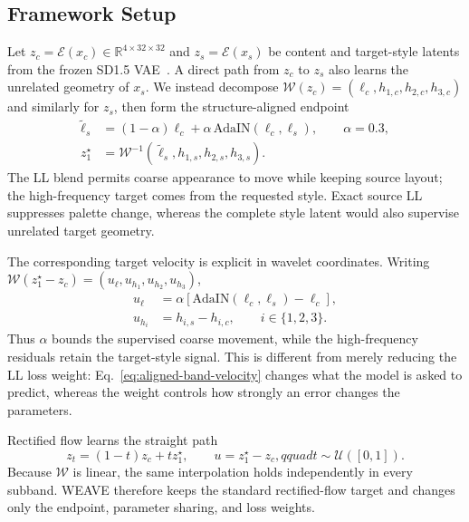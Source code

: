 \documentclass[letterpaper]{article}
\begin{document}
\subsection{Framework Setup}
\label{sec:framework}

Let $z_c=\mathcal E(x_c)\in\mathbb R^{4\times32\times32}$ and
$z_s=\mathcal E(x_s)$ be content and target-style latents from the frozen SD1.5
VAE~\cite{rombach2022high}. A direct path from $z_c$ to $z_s$ also learns the unrelated
geometry of $x_s$. We instead decompose
$\mathcal W(z_c)=(\ell_c,h_{1,c},h_{2,c},h_{3,c})$ and similarly for $z_s$, then form
the structure-aligned endpoint
\begin{equation}
\begin{aligned}
\tilde\ell_s &=(1-\alpha)\ell_c+
\alpha\,\mathrm{AdaIN}(\ell_c,\ell_s),\qquad \alpha=0.3,\\
z_1^\star&=\mathcal W^{-1}(\tilde\ell_s,h_{1,s},h_{2,s},h_{3,s}).
\end{aligned}
\label{eq:aligned-target}
\end{equation}
The LL blend permits coarse appearance to move while keeping source layout; the
high-frequency target comes from the requested style. Exact source LL suppresses palette
change, whereas the complete style latent would also supervise unrelated target geometry.

The corresponding target velocity is explicit in wavelet coordinates. Writing
$\mathcal W(z_1^\star-z_c)=(u_\ell,u_{h_1},u_{h_2},u_{h_3})$,
\begin{equation}
\begin{aligned}
u_\ell&=\alpha[\mathrm{AdaIN}(\ell_c,\ell_s)-\ell_c],\\
u_{h_i}&=h_{i,s}-h_{i,c},\qquad i\in\{1,2,3\}.
\end{aligned}
\label{eq:aligned-band-velocity}
\end{equation}
Thus $\alpha$ bounds the supervised coarse movement, while the high-frequency residuals
retain the target-style signal. This is different from merely reducing the LL loss weight:
Eq.~\ref{eq:aligned-band-velocity} changes what the model is asked to predict, whereas the
weight controls how strongly an error changes the parameters.

Rectified flow learns the straight path
\begin{equation}
z_t=(1-t)z_c+t z_1^\star,\qquad
u=z_1^\star-z_c,qquad t\sim\mathcal U([0,1]).
\label{eq:rf-path}
\end{equation}
Because $\mathcal W$ is linear, the same interpolation holds independently in every
subband. WEAVE therefore keeps the standard rectified-flow target and changes only the
endpoint, parameter sharing, and loss weights.
\end{document}
